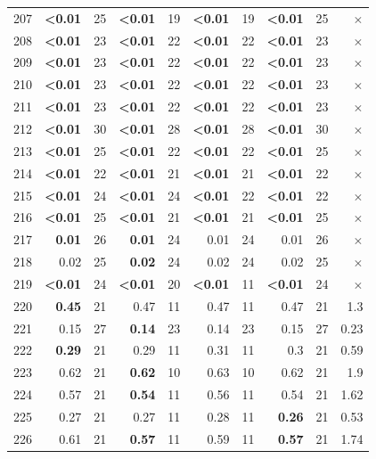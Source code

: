 \begin{longtable}{lr@{\hskip 4pt}l@{\hskip 12pt}r@{\hskip 4pt}l@{\hskip 12pt}r@{\hskip 4pt}l@{\hskip 12pt}r@{\hskip 4pt}l@{\hskip 12pt}r}
207 & \textbf{<0.01} & 25 & \textbf{<0.01} & 19 & \textbf{<0.01} & 19 & \textbf{<0.01} & 25 & $\times$ \\
208 & \textbf{<0.01} & 23 & \textbf{<0.01} & 22 & \textbf{<0.01} & 22 & \textbf{<0.01} & 23 & $\times$ \\
209 & \textbf{<0.01} & 23 & \textbf{<0.01} & 22 & \textbf{<0.01} & 22 & \textbf{<0.01} & 23 & $\times$ \\
210 & \textbf{<0.01} & 23 & \textbf{<0.01} & 22 & \textbf{<0.01} & 22 & \textbf{<0.01} & 23 & $\times$ \\
211 & \textbf{<0.01} & 23 & \textbf{<0.01} & 22 & \textbf{<0.01} & 22 & \textbf{<0.01} & 23 & $\times$ \\
212 & \textbf{<0.01} & 30 & \textbf{<0.01} & 28 & \textbf{<0.01} & 28 & \textbf{<0.01} & 30 & $\times$ \\
213 & \textbf{<0.01} & 25 & \textbf{<0.01} & 22 & \textbf{<0.01} & 22 & \textbf{<0.01} & 25 & $\times$ \\
214 & \textbf{<0.01} & 22 & \textbf{<0.01} & 21 & \textbf{<0.01} & 21 & \textbf{<0.01} & 22 & $\times$ \\
215 & \textbf{<0.01} & 24 & \textbf{<0.01} & 24 & \textbf{<0.01} & 22 & \textbf{<0.01} & 22 & $\times$ \\
216 & \textbf{<0.01} & 25 & \textbf{<0.01} & 21 & \textbf{<0.01} & 21 & \textbf{<0.01} & 25 & $\times$ \\
217 & \textbf{0.01} & 26 & \textbf{0.01} & 24 & 0.01 & 24 & 0.01 & 26 & $\times$ \\
218 & 0.02 & 25 & \textbf{0.02} & 24 & 0.02 & 24 & 0.02 & 25 & $\times$ \\
219 & \textbf{<0.01} & 24 & \textbf{<0.01} & 20 & \textbf{<0.01} & 11 & \textbf{<0.01} & 24 & $\times$ \\
220 & \textbf{0.45} & 21 & 0.47 & 11 & 0.47 & 11 & 0.47 & 21 & 1.3 \\
221 & 0.15 & 27 & \textbf{0.14} & 23 & 0.14 & 23 & 0.15 & 27 & 0.23 \\
222 & \textbf{0.29} & 21 & 0.29 & 11 & 0.31 & 11 & 0.3 & 21 & 0.59 \\
223 & 0.62 & 21 & \textbf{0.62} & 10 & 0.63 & 10 & 0.62 & 21 & 1.9 \\
224 & 0.57 & 21 & \textbf{0.54} & 11 & 0.56 & 11 & 0.54 & 21 & 1.62 \\
225 & 0.27 & 21 & 0.27 & 11 & 0.28 & 11 & \textbf{0.26} & 21 & 0.53 \\
226 & 0.61 & 21 & \textbf{0.57} & 11 & 0.59 & 11 & \textbf{0.57} & 21 & 1.74 \\

\end{longtable}
